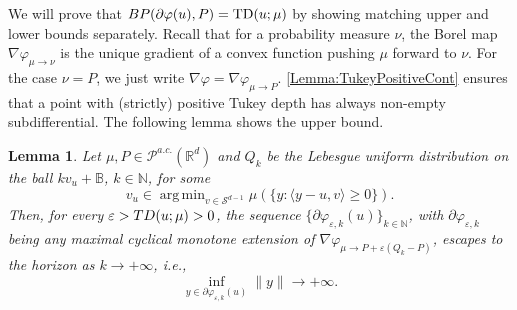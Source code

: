 \documentclass[11pt]{article}
\DeclareMathOperator*{\argmin}{arg\,min}
\newcommand{\R}{\mathbb{R}}
\newcommand{\N}{\mathbb{N}}
\newcommand{\eps}{\varepsilon}
\theoremstyle{plain}
\newtheorem{lemma}[sectioncount]{Lemma}
\theoremstyle{definition}
\begin{document}
We will prove that ${\rm BP}(\partial \varphi(u), P)=\mathrm{TD}(u; \mu)$ by showing matching  upper and lower bounds separately.  Recall that for a probability measure $\nu$, the Borel map $\nabla  \varphi_{\mu\to \nu}$ is the unique gradient of a convex function pushing $\mu$ forward to $\nu$.  For the case $\nu=P$, we just write $\nabla  \varphi=\nabla  \varphi_{\mu\to P}$.
\autoref{Lemma:TukeyPositiveCont} ensures that  a point  with (strictly) positive Tukey depth has always non-empty subdifferential.   The following lemma shows the upper bound. 
\begin{lemma}\label{lemma:LowerCont}
Let $\mu,P\in \mathcal{P}^{a.c.}(\R^d)$ and $Q_k$ be the Lebesgue uniform distribution on the ball $k v_u+\mathbb{B}$, $k\in \N$, for some 
 $$v_u\in \argmin_{v\in \mathcal{S}^{d-1}} \mu(\{ y: 
      \langle  y-u, v\rangle\geq 
0  \} ).$$
Then, for every $\eps>{\rm TD}(u;\mu)>0$, the sequence $\{\partial \varphi_{\eps,k}(u)\}_{k\in \N}$, with  
 $\partial \varphi_{\eps,k} $  being any maximal {  cyclical} monotone extension of $\nabla \varphi_{\mu\to P+\eps (Q_k-P)}$, escapes to the horizon as $k\to +\infty$, i.e.,   
    $$\inf_{y\in \partial \varphi_{\eps,k}(u)}\|y\|\to +\infty.$$
\end{lemma}
\end{document}
